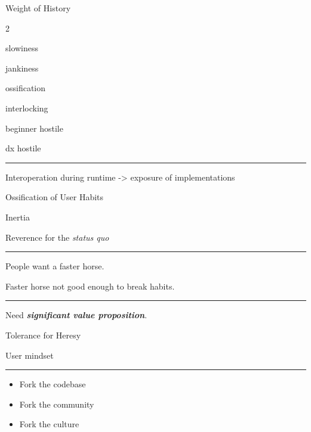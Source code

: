 \documentclass{beamer}
\begin{document}
\begin{frame}{Weight of History}

	\begin{itemize}


	\end{itemize}

	\rule{\textwidth}{0.1em}

	Interoperation during runtime -> exposure of implementations

\end{frame}


\begin{frame}[standout]

	Ossification of User Habits

\end{frame}


\begin{frame}{Inertia}

	Reverence for the \textit{status quo}

	\rule{\textwidth}{0.1em}

	People want a faster horse.

	Faster horse not good enough to break habits.

	\rule{\textwidth}{0.1em}

	Need \textbf{\textit{significant value proposition}}.

\end{frame}


\begin{frame}{Tolerance for Heresy}

	User mindset

	\rule{\textwidth}{0.1em}

	\begin{itemize}

		\item Fork the codebase

		\item Fork the community

		\item Fork the culture

	\end{itemize}

\end{frame}
\end{document}
